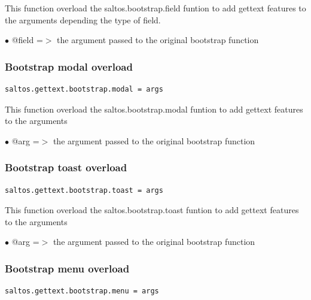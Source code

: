\documentclass[a4paper]{article}
\begin{document}
This function overload the saltos.bootstrap.field funtion to add gettext
features to the arguments depending the type of field.

\begin{compactitem}
\item[\color{myblue}$\bullet$] @field =$>$ the argument passed to the original bootstrap function
\end{compactitem}

\hypertarget{toc245}{}
\subsubsection{Bootstrap modal overload}

\begin{lstlisting}
saltos.gettext.bootstrap.modal = args
\end{lstlisting}

This function overload the saltos.bootstrap.modal funtion to add gettext
features to the arguments

\begin{compactitem}
\item[\color{myblue}$\bullet$] @arg =$>$ the argument passed to the original bootstrap function
\end{compactitem}

\hypertarget{toc246}{}
\subsubsection{Bootstrap toast overload}

\begin{lstlisting}
saltos.gettext.bootstrap.toast = args
\end{lstlisting}

This function overload the saltos.bootstrap.toast funtion to add gettext
features to the arguments

\begin{compactitem}
\item[\color{myblue}$\bullet$] @arg =$>$ the argument passed to the original bootstrap function
\end{compactitem}

\hypertarget{toc247}{}
\subsubsection{Bootstrap menu overload}

\begin{lstlisting}
saltos.gettext.bootstrap.menu = args
\end{lstlisting}
\end{document}
